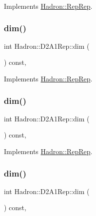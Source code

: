 Implements \mbox{\hyperlink{structHadron_1_1RepRep_a92c8802e5ed7afd7da43ccfd5b7cd92b}{Hadron\+::\+Rep\+Rep}}.

\mbox{\label{structHadron_1_1D2A1Rep_aba72a454b36e387861f8984650234865}} 
\subsubsection{\texorpdfstring{dim()}{dim()}\hspace{0.1cm}{\footnotesize\ttfamily [3/5]}}
{\footnotesize\ttfamily int Hadron\+::\+D2\+A1\+Rep\+::dim (\begin{DoxyParamCaption}{ }\end{DoxyParamCaption}) const\hspace{0.3cm}{\ttfamily [inline]}, {\ttfamily [virtual]}}



Implements \mbox{\hyperlink{structHadron_1_1RepRep_a92c8802e5ed7afd7da43ccfd5b7cd92b}{Hadron\+::\+Rep\+Rep}}.

\mbox{\label{structHadron_1_1D2A1Rep_aba72a454b36e387861f8984650234865}} 
\subsubsection{\texorpdfstring{dim()}{dim()}\hspace{0.1cm}{\footnotesize\ttfamily [4/5]}}
{\footnotesize\ttfamily int Hadron\+::\+D2\+A1\+Rep\+::dim (\begin{DoxyParamCaption}{ }\end{DoxyParamCaption}) const\hspace{0.3cm}{\ttfamily [inline]}, {\ttfamily [virtual]}}



Implements \mbox{\hyperlink{structHadron_1_1RepRep_a92c8802e5ed7afd7da43ccfd5b7cd92b}{Hadron\+::\+Rep\+Rep}}.

\mbox{\label{structHadron_1_1D2A1Rep_aba72a454b36e387861f8984650234865}} 
\subsubsection{\texorpdfstring{dim()}{dim()}\hspace{0.1cm}{\footnotesize\ttfamily [5/5]}}
{\footnotesize\ttfamily int Hadron\+::\+D2\+A1\+Rep\+::dim (\begin{DoxyParamCaption}{ }\end{DoxyParamCaption}) const\hspace{0.3cm}{\ttfamily [inline]}, {\ttfamily [virtual]}}



